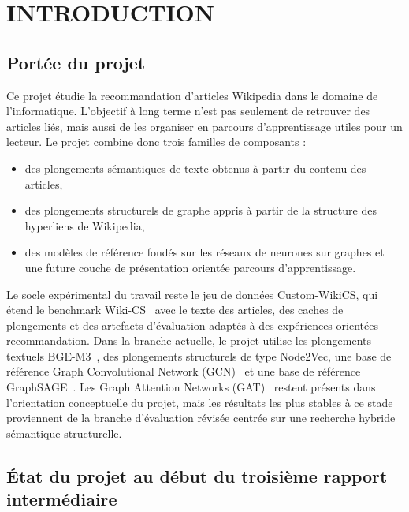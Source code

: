 \chapter{INTRODUCTION}
\thispagestyle{empty}

\section{Portée du projet}

Ce projet étudie la recommandation d'articles Wikipedia dans le domaine de
l'informatique. L'objectif à long terme n'est pas seulement de retrouver des
articles liés, mais aussi de les organiser en parcours d'apprentissage utiles
pour un lecteur. Le projet combine donc trois familles de composants :
\begin{itemize}
    \item des plongements sémantiques de texte obtenus à partir du contenu des
    articles,
    \item des plongements structurels de graphe appris à partir de la structure
    des hyperliens de Wikipedia,
    \item des modèles de référence fondés sur les réseaux de neurones sur
    graphes et une future couche de présentation orientée parcours
    d'apprentissage.
\end{itemize}

Le socle expérimental du travail reste le jeu de données Custom-WikiCS, qui
étend le benchmark Wiki-CS~\cite{mernyei2020wikics} avec le texte des
articles, des caches de plongements et des artefacts d'évaluation adaptés à
des expériences orientées recommandation. Dans la branche actuelle, le projet
utilise les plongements textuels BGE-M3~\cite{chen2025bgem3}, des plongements
structurels de type Node2Vec, une base de référence Graph Convolutional Network
(GCN)~\cite{kipf2017semi} et une base de référence GraphSAGE~\cite{hamilton2017inductive}.
Les Graph Attention Networks (GAT)~\cite{velickovic2018graph} restent présents
dans l'orientation conceptuelle du projet, mais les résultats les plus stables
à ce stade proviennent de la branche d'évaluation révisée centrée sur une
recherche hybride sémantique-structurelle.

\section{État du projet au début du troisième rapport intermédiaire}

